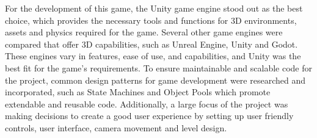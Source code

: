 \documentclass[]{final_report}
\begin{document}
\color{red} For the development of this game, the Unity game engine stood out as the best choice\color{black}, which provides the necessary tools and functions for 3D environments, assets and physics required for the game. Several other game engines were compared that offer 3D capabilities, such as Unreal Engine, Unity and Godot. These engines vary in features, ease of use, and capabilities, and Unity was the best fit for the game's requirements. To ensure maintainable and scalable code for the project, common design patterns for game development were researched and incorporated, such as State Machines and Object Pools which promote extendable and reusable code. Additionally, a large focus of the project was making decisions to \color{red} create a good user experience by setting up user friendly controls, user interface, camera movement and level design. \color{black}
\end{document}
